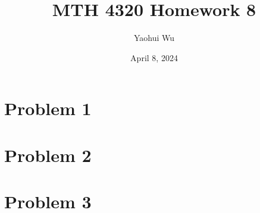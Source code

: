 \documentclass[12pt]{article}
\title{MTH 4320 Homework 8}
\author{Yaohui Wu}
\date{April 8, 2024}
\begin{document}
\maketitle
\section*{Problem 1}
\section*{Problem 2}
\section*{Problem 3}
\end{document}
